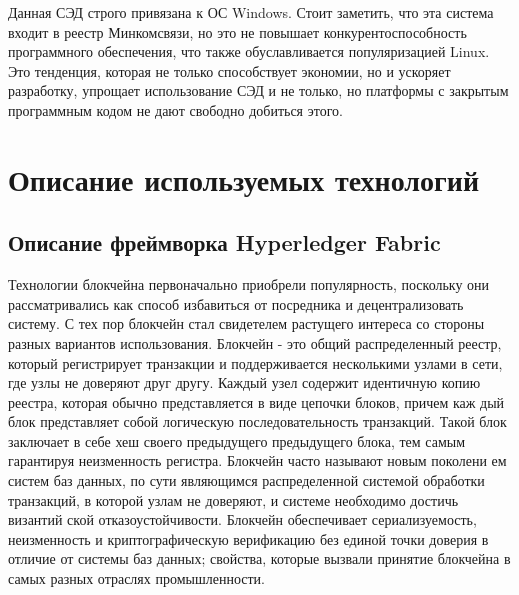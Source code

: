 Данная СЭД строго привязана к ОС Windows. Стоит заметить, что эта система входит в реестр Минкомсвязи, но это не повышает конкурентоспособность программного обеспечения, что также обуславливается популяризацией Linux. Это тенденция, которая не только способствует экономии, но и ускоряет разработку, упрощает использование СЭД и не только, но платформы с закрытым программным кодом не дают свободно добиться этого. 

\section{Описание используемых технологий} \label{sec:ch1/sec3}

\subsection{Описание фреймворка Hyperledger Fabric} \label{subsec:ch1/sec3/subsec1}
Технологии блокчейна первоначально приобрели популярность, поскольку они рассматривались как способ избавиться от посредника и децентрализовать систему. С тех пор блокчейн стал свидетелем растущего интереса со стороны разных вариантов использования. Блокчейн - это общий распределенный реестр, который регистрирует транзакции и поддерживается несколькими узлами в сети, где узлы не доверяют друг другу. Каждый узел содержит идентичную копию реестра, которая обычно представляется в виде цепочки блоков, причем каж­ дый блок представляет собой логическую последовательность транзакций. Такой блок заключает в себе хеш своего предыдущего предыдущего блока, тем самым гарантируя неизменность регистра. Блокчейн часто называют новым поколени­ ем систем баз данных, по сути являющимся распределенной системой обработки транзакций, в которой узлам не доверяют, и системе необходимо достичь византий­ ской отказоустойчивости. Блокчейн обеспечивает сериализуемость, неизменность и криптографическую верификацию без единой точки доверия в отличие от систе­мы баз данных; свойства, которые вызвали принятие блокчейна в самых разных отраслях промышленности.


